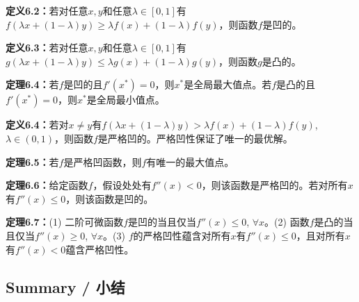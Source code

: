 \begin{translation}
\textbf{定义6.2：}若对任意$x, y$和任意$\lambda \in [0,1]$有$f(\lambda x + (1 - \lambda)y) \ge \lambda f(x) + (1 - \lambda) f(y)$，则函数$f$是凹的。

\textbf{定义6.3：}若对任意$x, y$和任意$\lambda \in [0,1]$有$g(\lambda x + (1 - \lambda)y) \le \lambda g(x) + (1 - \lambda) g(y)$，则函数$g$是凸的。

\textbf{定理6.4：}若$f$是凹的且$f'(x^*) = 0$，则$x^*$是全局最大值点。若$f$是凸的且$f'(x^*) = 0$，则$x^*$是全局最小值点。

\textbf{定义6.4：}若对$x \neq y$有$f(\lambda x + (1 - \lambda)y) > \lambda f(x) + (1 - \lambda) f(y)$, $\lambda \in (0,1)$，则函数$f$是严格凹的。严格凹性保证了唯一的最优解。

\textbf{定理6.5：}若$f$是严格凹函数，则$f$有唯一的最大值点。

\textbf{定理6.6：}给定函数$f$，假设处处有$f''(x) < 0$，则该函数是严格凹的。若对所有$x$有$f''(x) \le 0$，则该函数是凹的。

\textbf{定理6.7：}(1) 二阶可微函数$f$是凹的当且仅当$f''(x) \le 0$, $\forall x$。(2) 函数$f$是凸的当且仅当$f''(x) \ge 0$, $\forall x$。(3) $f$的严格凹性蕴含对所有$x$有$f''(x) \le 0$，且对所有$x$有$f''(x) < 0$蕴含严格凹性。
\end{translation}

\subsection{Summary / 小结}

